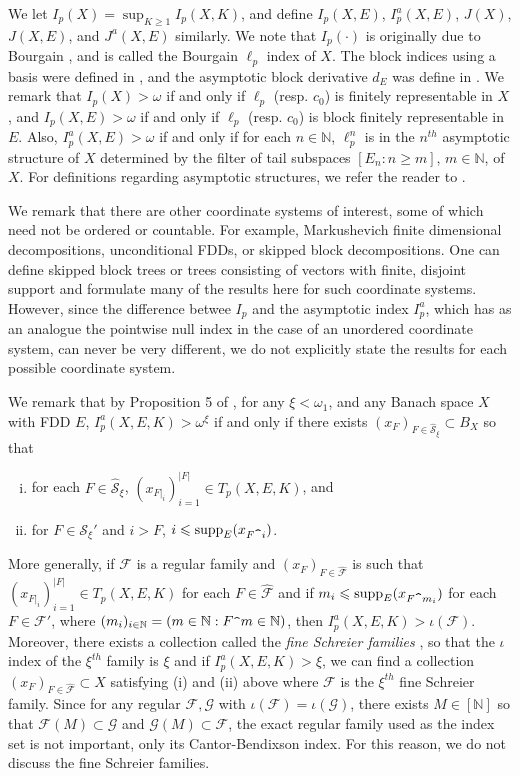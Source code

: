 \documentclass[12pt]{amsart}
\theoremstyle{definition}
\newcommand{\infin}{[\mathbb{N}]}
\newcommand{\nn}{\mathbb{N}}
\newcommand{\fff}{\mathcal{F}}
\newcommand{\gggg}{\mathcal{G}}
\newcommand{\sss}{\mathcal{S}}
\newcommand{\supp}{\mathrm{supp}}
\begin{document}
We let $I_p(X)=\sup_{K\geqslant 1}I_p(X,K)$, and define $I_p(X,E)$, $I^a_p(X,E)$, $J(X)$, $J(X,E)$, and $J^a(X,E)$ similarly.  We note that $I_p(\cdot)$ is originally due to Bourgain \cite{Bo}, and is called the Bourgain $\ell_p$ index of $X$.  The block indices using a basis were defined in \cite{JO}, and the asymptotic block derivative $d_E$ was define in \cite{OSZ}. We remark that $I_p(X)>\omega$ if and only if $\ell_p$ (resp. $c_0$) is finitely representable in $X$, and $I_p(X, E)>\omega$ if and only if $\ell_p$ (resp. $c_0$) is block finitely representable in $E$. Also, $I^a_p(X,E)>\omega$ if and only if for each $n\in \nn$, $\ell_p^n$ is in the $n^{th}$ asymptotic structure of $X$ determined by the filter of tail subspaces $[E_n:n\geqslant m]$, $m\in \nn$, of $X$.  For definitions regarding asymptotic structures, we refer the reader to \cite{MMT}.  

We remark that there are other coordinate systems of interest, some of which need not be ordered or countable.  For example, Markushevich finite dimensional decompositions, unconditional FDDs, or skipped block decompositions.  One can define skipped block trees or trees consisting of vectors with finite, disjoint support and formulate many of the results here for such coordinate systems.  However, since the difference betwee $I_p$ and the asymptotic index $I^a_p$, which has as an analogue the pointwise null index in the case of an unordered coordinate system, can never be very different, we do not explicitly state the results for each possible coordinate system.  



We remark that by Proposition 5 of \cite{OSZ}, for any $\xi<\omega_1$, and any Banach space $X$ with FDD $E$, $I^a_p(X,E,K)>\omega^\xi$ if and only if there exists $(x_F)_{F\in \widehat{\sss}_\xi}\subset B_X$ so that \begin{enumerate}[(i)]\item for each $F\in \widehat{\sss}_\xi$, $(x_{F|_i})_{i=1}^{|F|}\in T_p(X,E,K)$, and \item for $F\in \sss_\xi'$ and $i>F$, $i\leqslant \supp_E(x_{F\verb!^!i})$. \end{enumerate}

More generally, if $\fff$ is a regular family and $(x_F)_{F\in \widehat{\fff}}$ is such that $(x_{F|_i})_{i=1}^{|F|}\in T_p(X,E,K)$ for each $F\in \widehat{\fff}$ and if $m_i\leqslant \supp_E(x_{F\verb!^!m_i})$ for each $F\in \fff'$, where $(m_i)_{i\in \nn}=(m\in \nn: F\verb!^!m\in \nn)$, then $I^a_p(X,E,K)>\iota(\fff)$.  Moreover, there exists a collection called the \emph{fine Schreier families} \cite{OSZ}, so that the $\iota$ index of the $\xi^{th}$ family is $\xi$ and if  $I^a_p(X, E, K)>\xi$, we can find a collection $(x_F)_{F\in \widehat{\fff}}\subset X$ satisfying (i) and (ii) above where $\fff$ is the $\xi^{th}$ fine Schreier family.  Since for any regular $\fff, \gggg$ with $\iota(\fff)=\iota(\gggg)$, there exists $M\in \infin$ so that $\fff(M)\subset \gggg$ and $\gggg(M)\subset \fff$, the exact regular family used as the index set is not important, only its Cantor-Bendixson index.  For this reason, we do not discuss the fine Schreier families.  
\end{document}
